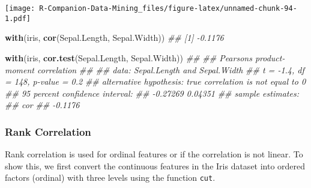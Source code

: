 \documentclass[
  notitlepage]{book}
\newenvironment{Shaded}{\begin{snugshade}}{\end{snugshade}}
\newcommand{\CommentTok}[1]{\textcolor[rgb]{0.56,0.35,0.01}{\textit{#1}}}
\newcommand{\KeywordTok}[1]{\textcolor[rgb]{0.13,0.29,0.53}{\textbf{#1}}}
\newcommand{\NormalTok}[1]{#1}
\begin{document}
\texttt{[image: R-Companion-Data-Mining\_files/figure-latex/unnamed-chunk-94-1.pdf]}

\begin{Shaded}
\begin{Highlighting}[]
\KeywordTok{with}\NormalTok{(iris, }\KeywordTok{cor}\NormalTok{(Sepal.Length, Sepal.Width)) }
\CommentTok{\#\# [1] {-}0.1176}
\end{Highlighting}
\end{Shaded}

\begin{Shaded}
\begin{Highlighting}[]
\KeywordTok{with}\NormalTok{(iris, }\KeywordTok{cor.test}\NormalTok{(Sepal.Length, Sepal.Width))}
\CommentTok{\#\# }
\CommentTok{\#\#  Pearson\textquotesingle{}s product{-}moment correlation}
\CommentTok{\#\# }
\CommentTok{\#\# data:  Sepal.Length and Sepal.Width}
\CommentTok{\#\# t = {-}1.4, df = 148, p{-}value = 0.2}
\CommentTok{\#\# alternative hypothesis: true correlation is not equal to 0}
\CommentTok{\#\# 95 percent confidence interval:}
\CommentTok{\#\#  {-}0.27269  0.04351}
\CommentTok{\#\# sample estimates:}
\CommentTok{\#\#     cor }
\CommentTok{\#\# {-}0.1176}
\end{Highlighting}
\end{Shaded}

\hypertarget{rank-correlation}{%
\subsubsection{Rank Correlation}\label{rank-correlation}}

Rank correlation is used for ordinal features or if the correlation is
not linear. To show this, we first convert the continuous features in
the Iris dataset into ordered factors (ordinal) with three levels using
the function \texttt{cut}.
\end{document}
